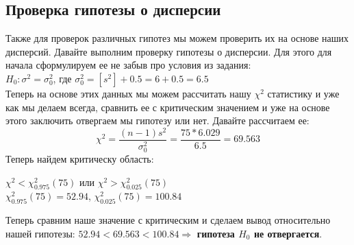 \documentclass[12pt]{article}
\begin{document}
\subsection{Проверка гипотезы о дисперсии}
Также для проверок различных гипотез мы можем проверить их на основе наших дисперсий. Давайте выполним проверку гипотезы о дисперсии.
Для этого для начала сформулируем ее не забыв про условия из задания:\\
$H_0: \sigma^2 = \sigma_0^2$, где $\sigma_0^2 = [s^2] + 0.5 = 6 + 0.5 = 6.5$ \\
Теперь на основе этих данных мы можем рассчитать нашу $\chi^2$ статистику и уже как мы делаем всегда, сравнить ее с критическим значением и уже на основе этого заключить отвергаем мы гипотезу или нет.
Давайте рассчитаем ее:
\[
\chi^2 = \frac{(n-1)s^2}{\sigma_0^2} = \frac{75 * 6.029}{6.5} = 69.563
\]
Теперь найдем критическу область:\\
\begin{centering}
$\chi^2 < \chi^2_{0.975}(75)$ или $\chi^2 > \chi^2_{0.025}(75)$\\
\vspace{3mm}
$\chi^2_{0.975}(75) = 52.94$, $\chi^2_{0.025}(75) = 100.84$ \\
\end{centering}
\vspace{5mm}
Теперь сравним наше значение с критическим и сделаем вывод относительно нашей гипотезы: $52.94 < 69.563 < 100.84 \Rightarrow$ \textbf{гипотеза $H_0$ не отвергается}.
\end{document}
